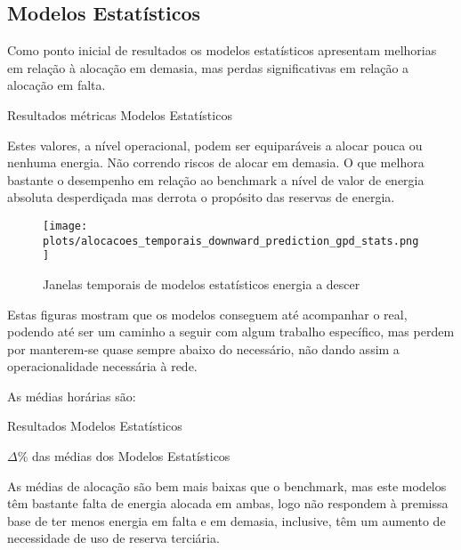\subsection{Modelos Estatísticos \label{se:resstats}}
Como ponto inicial de resultados os modelos estatísticos apresentam melhorias em relação à alocação em demasia, mas perdas significativas em relação a alocação em falta.\par

\begin{table}[H]
    \caption{Resultados métricas Modelos Estatísticos}    
    \resizebox{\linewidth}{!}{}
    \label{tab:statsmetrics}
    \end{table}

Estes valores, a nível operacional, podem ser equiparáveis a alocar pouca ou nenhuma energia. Não correndo riscos de alocar em demasia. O que melhora bastante o desempenho em relação ao benchmark a nível de valor de energia absoluta desperdiçada mas derrota o propósito das reservas de energia.\par



\begin{figure}[H]
    \centering
    \texttt{[image: plots/alocacoes\_temporais\_downward\_prediction\_gpd\_stats.png]}
    \caption{Janelas temporais de modelos estatísticos energia a descer}
    \label{fig:statstimewindowsdown}
\end{figure}

Estas figuras mostram que os modelos conseguem até acompanhar o real, podendo até ser um caminho a seguir com algum trabalho específico, mas perdem por manterem-se quase sempre abaixo do necessário, não dando assim a operacionalidade necessária à rede.\par
As médias horárias são:\\
\begin{table}[H]
    \centering
    \resizebox{0.8\linewidth}{!}{}
    \caption{Resultados Modelos Estatísticos}
    \label{tab:statsres}
    \end{table}



\begin{table}[H]
    \centering
    \resizebox{\linewidth}{!}{}
    \caption{$\Delta$\% das médias dos Modelos Estatísticos}    
    \label{tab:statsres_deltas}
    \end{table}

As médias de alocação são bem mais baixas que o benchmark, mas este modelos têm bastante falta de energia alocada em ambas, logo não respondem à premissa base de ter menos energia em falta e em demasia, inclusive, têm um aumento de necessidade de uso de reserva terciária.\par
